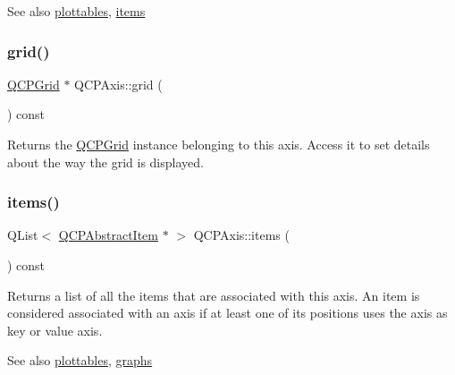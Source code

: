 \begin{DoxySeeAlso}{See also}
\mbox{\hyperlink{class_q_c_p_axis_ac5e0f6f65c75efb5fd32275d6e4ef0d6}{plottables}}, \mbox{\hyperlink{class_q_c_p_axis_a42761bc68e2f3a9f68549d45b73f705b}{items}} 
\end{DoxySeeAlso}
\mbox{\label{class_q_c_p_axis_a63f1dd2df663680d2a8d06c19592dd63}} 
\subsubsection{\texorpdfstring{grid()}{grid()}}
{\footnotesize\ttfamily \mbox{\hyperlink{class_q_c_p_grid}{Q\+C\+P\+Grid}} $\ast$ Q\+C\+P\+Axis\+::grid (\begin{DoxyParamCaption}{ }\end{DoxyParamCaption}) const\hspace{0.3cm}{\ttfamily [inline]}}

Returns the \mbox{\hyperlink{class_q_c_p_grid}{Q\+C\+P\+Grid}} instance belonging to this axis. Access it to set details about the way the grid is displayed. \mbox{\label{class_q_c_p_axis_a42761bc68e2f3a9f68549d45b73f705b}} 
\subsubsection{\texorpdfstring{items()}{items()}}
{\footnotesize\ttfamily Q\+List$<$ \mbox{\hyperlink{class_q_c_p_abstract_item}{Q\+C\+P\+Abstract\+Item}} $\ast$ $>$ Q\+C\+P\+Axis\+::items (\begin{DoxyParamCaption}{ }\end{DoxyParamCaption}) const}

Returns a list of all the items that are associated with this axis. An item is considered associated with an axis if at least one of its positions uses the axis as key or value axis.

\begin{DoxySeeAlso}{See also}
\mbox{\hyperlink{class_q_c_p_axis_ac5e0f6f65c75efb5fd32275d6e4ef0d6}{plottables}}, \mbox{\hyperlink{class_q_c_p_axis_ad590c0da223697a2727f97a520870fec}{graphs}} 
\end{DoxySeeAlso}
\mbox{\label{class_q_c_p_axis_ac0a6b77bd52bec6c81cd62d167cfeba6}} 

